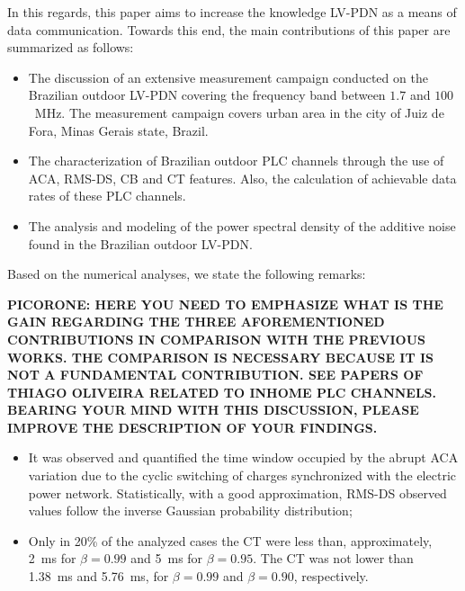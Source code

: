 \documentclass[journal]{IEEEtran}
\begin{document}
In this regards, this paper aims to increase the knowledge \ac{LV-PDN} as a means of data communication. Towards this end, the main contributions of this paper are summarized as follows:\color{black}
\begin{itemize}
	\item The discussion of an extensive measurement campaign conducted on the Brazilian outdoor \ac{LV-PDN} covering the frequency band between $1.7$ and $100$~MHz. The measurement campaign covers urban area in the city of Juiz de Fora, Minas Gerais state, Brazil.	
	\item The characterization of Brazilian outdoor \ac{PLC} channels through the use of \ac{ACA}, \ac{RMS-DS}, \ac{CB} and \ac{CT} features. Also, the calculation of achievable data rates of these \ac{PLC} channels.
	\item The analysis and modeling of the power spectral density of the additive noise found in the Brazilian outdoor \ac{LV-PDN}. 
\end{itemize}

Based on the numerical analyses, we state the following remarks:

\textbf{PICORONE: HERE YOU NEED TO EMPHASIZE WHAT IS THE GAIN REGARDING THE THREE AFOREMENTIONED CONTRIBUTIONS IN COMPARISON WITH THE PREVIOUS WORKS. THE COMPARISON IS NECESSARY BECAUSE IT IS NOT A FUNDAMENTAL CONTRIBUTION. SEE PAPERS OF THIAGO OLIVEIRA RELATED TO INHOME PLC CHANNELS. BEARING YOUR MIND WITH THIS DISCUSSION, PLEASE IMPROVE THE DESCRIPTION OF YOUR FINDINGS.}

\begin{itemize}

	\item It was observed and quantified the time window occupied by the abrupt \ac{ACA} variation due to the cyclic switching of charges synchronized with the electric power network. 
	Statistically, \color{blue} with a good approximation, \ac{RMS-DS} observed values follow the inverse Gaussian probability distribution; \color{black} 
	\item Only in 20\% of the analyzed cases the \ac{CT} \color{blue} were \color{black} less than, approximately, 2~ms for $\beta = 0.99$ and 5~ms for $\beta = 0.95$. 
	The \ac{CT} was not lower than 1.38~ms and 5.76~ms, for $\beta=0.99$ and $\beta = 0.90$, respectively.
\end{itemize}
\end{document}
